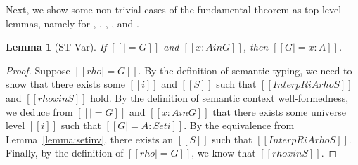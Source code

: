 \documentclass[\ifpublic nolinenum\else\fi,online,OA]{jfp}
\newcommand{\scw}[1]{}
\newtheorem{lemma}[theorem]{Lemma}
\theoremstyle{definition}
\begin{document}
Next, we show some non-trivial cases of the fundamental theorem as
top-level lemmas, namely for , , ,
, and .

\begin{lemma}[ST-Var]
  \label{lemma:stvar}
  If $[[|= G]]$ and $[[x : A in G]]$, then $[[G |= x : A]]$.
\end{lemma}
\begin{proof}
  Suppose $[[rho |= G]]$. By the definition of semantic typing, we
  need to show that there exists some $[[i]]$ and $[[S]]$ such that
  $[[InterpR i A { rho } S]]$ and $[[rho x in S]]$ hold.
  By the definition of semantic context well-formedness, we deduce
  from $[[|= G]]$ and $[[x : A in G]]$ that there exists some universe
  level $[[i]]$ such that $[[G |= A : Set i]]$. By
  the equivalence from Lemma~\ref{lemma:setinv}, there exists an $[[S]]$
  such that $[[InterpR i A {rho} S]]$. Finally, by the definition of
  $[[rho |= G]]$, we know that $[[rho x in S]]$.
\end{proof}


\end{document}
